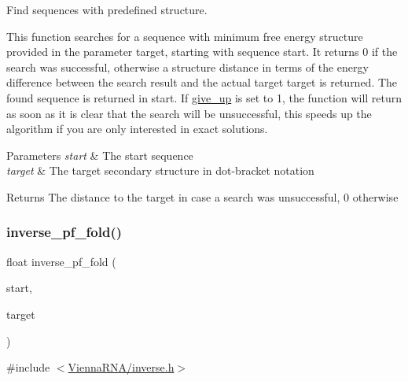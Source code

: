 Find sequences with predefined structure. 

This function searches for a sequence with minimum free energy structure provided in the parameter \textquotesingle{}target\textquotesingle{}, starting with sequence \textquotesingle{}start\textquotesingle{}. It returns 0 if the search was successful, otherwise a structure distance in terms of the energy difference between the search result and the actual target \textquotesingle{}target\textquotesingle{} is returned. The found sequence is returned in \textquotesingle{}start\textquotesingle{}. If \mbox{\hyperlink{group__inverse__fold_ga7ec4ba51f86e1717a1e174264e4a75ce}{give\+\_\+up}} is set to 1, the function will return as soon as it is clear that the search will be unsuccessful, this speeds up the algorithm if you are only interested in exact solutions.


\begin{DoxyParams}{Parameters}
{\em start} & The start sequence \\
\hline
{\em target} & The target secondary structure in dot-\/bracket notation \\
\hline
\end{DoxyParams}
\begin{DoxyReturn}{Returns}
The distance to the target in case a search was unsuccessful, 0 otherwise 
\end{DoxyReturn}
\mbox{\label{group__inverse__fold_gaeef52ecbf2a2450ad585a344f9826806}} 
\subsubsection{\texorpdfstring{inverse\+\_\+pf\+\_\+fold()}{inverse\_pf\_fold()}}
{\footnotesize\ttfamily float inverse\+\_\+pf\+\_\+fold (\begin{DoxyParamCaption}\item[{char $\ast$}]{start,  }\item[{const char $\ast$}]{target }\end{DoxyParamCaption})}



{\ttfamily \#include $<$\mbox{\hyperlink{inverse_8h}{Vienna\+R\+N\+A/inverse.\+h}}$>$}



